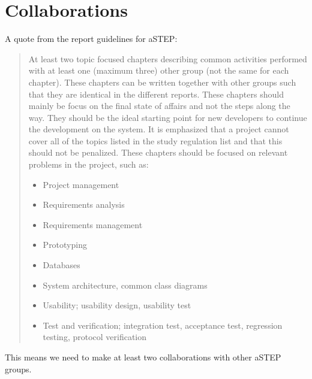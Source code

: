\chapter{Collaborations}\label{sec:collaboration}
A quote from the report guidelines for aSTEP\cite{guidelines}: 
\begin{quotation}
	At least two topic focused chapters describing common activities performed with at least one (maximum three) other group (not the same for each chapter). These chapters can be written together with other groups such that they are identical in the different reports. These chapters should mainly be focus on the final state of affairs and not the steps along the way. They should be the ideal starting point for new developers to continue the development on the system. It is emphasized that a project cannot cover all of the topics listed in the study regulation list and that this should not be penalized. These chapters should be focused on relevant problems in the project, such as:
	\begin{itemize}
		\item Project management
		\item Requirements analysis
		\item Requirements management
		\item Prototyping
		\item Databases
		\item System architecture, common class diagrams
		\item Usability; usability design, usability test
		\item Test and verification; integration test, acceptance test, regression testing, protocol verification
	\end{itemize}
\end{quotation}

This means we need to make at least two collaborations with other aSTEP groups.



